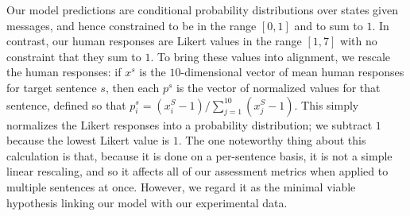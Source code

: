 \documentclass[leqno,12pt]{article}
\begin{document}

Our model predictions are conditional probability distributions over
states given messages, and hence constrained to be in the range
$[0,1]$ and to sum to $1$. In contrast, our human responses are Likert
values in the range $[1,7]$ with no constraint that they sum to
$1$. To bring these values into alignment, we rescale the human
responses: if $x^{s}$ is the $10$-dimensional vector of mean human
responses for target sentence $s$, then each $p^{s}$ is the vector of
normalized values for that sentence, defined so that $p^{s}_{i} =
(x^{S}_{i}-1)/\sum_{j=1}^{10}(x^{S}_{j}-1)$. This simply normalizes
the Likert responses into a probability distribution; we subtract $1$
because the lowest Likert value is $1$. The one noteworthy thing about
this calculation is that, because it is done on a per-sentence basis,
it is not a simple linear rescaling, and so it affects all of our
assessment metrics when applied to multiple sentences at
once. However, we regard it as the minimal viable hypothesis linking
our model with our experimental data.
\end{document}
